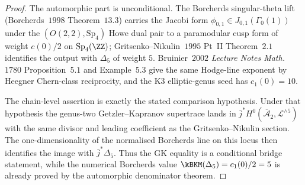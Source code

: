 \begin{proof}
The automorphic part is unconditional. The Borcherds singular-theta lift (Borcherds~$1998$ Theorem~$13.3$) carries the Jacobi form $\phi_{0, 1} \in J_{0, 1}(\Gamma_0(1))$ under the $(O(2, 2), \mathrm{Sp}_4)$ Howe dual pair to a paramodular cusp form of weight $c(0)/2$ on $\mathrm{Sp}_4(\ZZ)$; Gritsenko--Nikulin~$1995$ Pt~II Theorem~$2.1$ identifies the output with $\Delta_5$ of weight $5$. Bruinier~$2002$ \emph{Lecture Notes Math.}~$1780$ Proposition~$5.1$ and Example~$5.3$ give the same Hodge-line exponent by Heegner Chern-class reciprocity, and the K3 elliptic-genus seed has $c_1(0)=10$.

The chain-level assertion is exactly the stated comparison hypothesis. Under that hypothesis the genus-two Getzler--Kapranov supertrace lands in $\bar j^*H^0(\overline{\mathcal A}_2,\mathcal L^{\wedge 5})$ with the same divisor and leading coefficient as the Gritsenko--Nikulin section. The one-dimensionality of the normalised Borcherds line on this locus then identifies the image with $\bar j^*\Delta_5$. Thus the GK equality is a conditional bridge statement, while the numerical Borcherds value $\kBKM(\Delta_5)=c_1(0)/2=5$ is already proved by the automorphic denominator theorem.
\end{proof}

